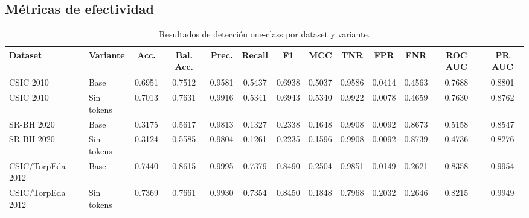 \documentclass[12pt,oneside]{report}
\begin{document}
\subsection{Métricas de efectividad}
\begin{table}[H]
\centering
\caption{Resultados de detección one-class por dataset y variante.}
\label{tab:res-one-eff}
\scriptsize
\renewcommand{\arraystretch}{1.12}
\begin{adjustbox}{max width=\textwidth}
\begin{tabular}{llccccccccccc}
\toprule
\textbf{Dataset} & \textbf{Variante} & \textbf{Acc.} & \textbf{Bal. Acc.} & \textbf{Prec.} & \textbf{Recall} & \textbf{F1} & \textbf{MCC} & \textbf{TNR} & \textbf{FPR} & \textbf{FNR} & \textbf{ROC AUC} & \textbf{PR AUC} \\
\midrule
CSIC 2010 & Base & 0.6951 & 0.7512 & 0.9581 & 0.5437 & 0.6938 & 0.5037 & 0.9586 & 0.0414 & 0.4563 & 0.7688 & 0.8801 \\CSIC 2010 & Sin tokens & 0.7013 & 0.7631 & 0.9916 & 0.5341 & 0.6943 & 0.5340 & 0.9922 & 0.0078 & 0.4659 & 0.7630 & 0.8762 \\SR-BH 2020 & Base & 0.3175 & 0.5617 & 0.9813 & 0.1327 & 0.2338 & 0.1648 & 0.9908 & 0.0092 & 0.8673 & 0.5158 & 0.8547 \\SR-BH 2020 & Sin tokens & 0.3124 & 0.5585 & 0.9804 & 0.1261 & 0.2235 & 0.1596 & 0.9908 & 0.0092 & 0.8739 & 0.4736 & 0.8276 \\CSIC/TorpEda 2012 & Base & 0.7440 & 0.8615 & 0.9995 & 0.7379 & 0.8490 & 0.2504 & 0.9851 & 0.0149 & 0.2621 & 0.8358 & 0.9954 \\CSIC/TorpEda 2012 & Sin tokens & 0.7369 & 0.7661 & 0.9930 & 0.7354 & 0.8450 & 0.1848 & 0.7968 & 0.2032 & 0.2646 & 0.8215 & 0.9949 \\\bottomrule
\end{tabular}
\end{adjustbox}
\end{table}
\end{document}
